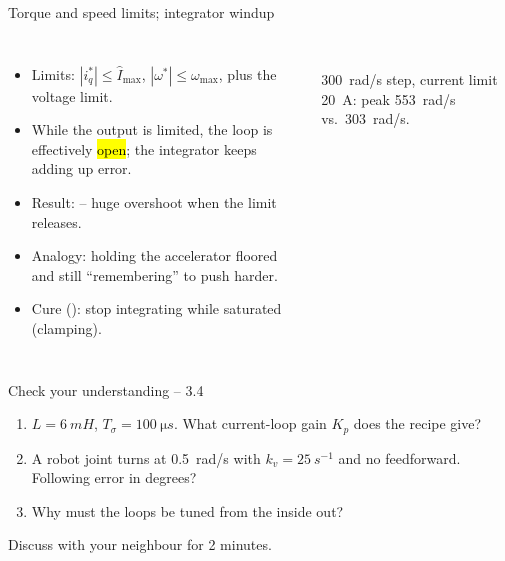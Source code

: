 \documentclass[aspectratio=169,10pt]{beamer}
\begin{document}
\begin{frame}[t]{Torque and speed limits; integrator windup}
\begin{columns}[T,onlytextwidth]
\begin{itemize}\small
\item Limits: $|i_q^*|\le\hat I_\text{max}$, $|\omega^*|\le\omega_\text{max}$, plus the voltage limit.
\item While the output is limited, the loop is effectively \hl{open}; the integrator keeps adding up error.
\item Result:  -- huge overshoot when the limit releases.
\item Analogy: holding the accelerator floored and still ``remembering'' to push harder.
\item Cure (): stop integrating while saturated (clamping).
\end{itemize}
\\
\small \SI{300}{rad/s} step, current limit \SI{20}{A}: peak \SI{553}{rad/s} vs.\ \SI{303}{rad/s}.
\end{columns}
\end{frame}

\begin{frame}[t]{Check your understanding -- 3.4}
\vspace{4mm}
\begin{keybox}
\large
\begin{enumerate}
\item $L=\SI{6}{mH}$, $T_\sigma=\SI{100}{\micro s}$. What current-loop gain $K_p$ does the recipe give?\\[3mm]
\item A robot joint turns at \SI{0.5}{rad/s} with $k_v=\SI{25}{s^{-1}}$ and no feedforward. Following error in degrees?\\[3mm]
\item Why must the loops be tuned from the inside out?
\end{enumerate}
\end{keybox}
\vfill
\centering\small\color{mkGray} Discuss with your neighbour for 2 minutes.
\end{frame}
\end{document}
